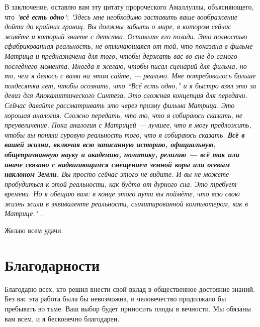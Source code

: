 \documentclass[10pt,twocolumn,letterpaper]{article}
\begin{document}
В заключение, оставлю вам эту цитату пророческого Амаллуллы, объясняющего, что \textit{"\textbf{всё есть одно}"}: \textit{"Здесь мне необходимо заставить ваше воображение дойти до крайних границ. Вы должны забыть о мире, в котором сейчас живёте и который знаете с детства. Оставьте его позади. Это полностью сфабрикованная реальность, не отличающаяся от той, что показана в фильме Матрица и предназначена для того, чтобы держать вас во сне до самого последнего момента. Иногда я желаю, чтобы писал сценарий для фильма, но то, чем я делюсь с вами на этом сайте, — реально. Мне потребовалось больше полдесятка лет, чтобы осознать, что “Всё есть одно,” и я быстро взял это за девиз для Апокалиптического Синтеза. Это сложная концепция для передачи. Сейчас давайте рассматривать это через призму фильма Матрица. Это хорошая аналогия. Сложно передать, что то, что я собираюсь сказать, не преувеличение. Пока аналогия с Матрицей — лучшее, что я могу предложить, чтобы вы поняли суровую реальность того, что я собираюсь сказать. \textbf{Всё в вашей жизни, включая всю записанную историю, официальную, общепризнанную науку и академию, политику, религию — всё так или иначе связано с надвигающимся смещением земной коры или осевым наклоном Земли.} Вы просто сейчас этого не видите. И вы не можете пробудиться к этой реальности, как будто от дурного сна. Это требует времени. Но я обещаю вам: в конце этого пути вы поймёте, что всю свою жизнь жили в эквиваленте реальности, сымитированной компьютером, как в Матрице."} \cite{33,34}.

Желаю всем удачи.
\section{Благодарности}

Благодарю всех, кто решил внести свой вклад в общественное достояние знаний. Без вас эта работа была бы невозможна, и человечество продолжало бы пребывать во тьме. Ваш выбор будет приносить плоды в вечности. Мы обязаны вам всем, и я бесконечно благодарен.

\clearpage
\twocolumn

{\small
\renewcommand{\refname}{Литература}


}
\end{document}
